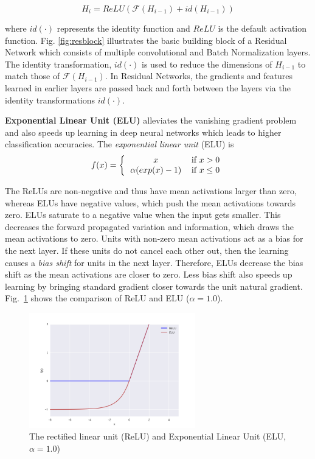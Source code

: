 \documentclass[10pt,twocolumn,letterpaper]{article}
\begin{document}
\begin{equation} \label{eq:1}
 H_i = ReLU( \mathcal{F}(H_{i-1}) + id(H_{i-1} ))
\end{equation}

where \( id(\cdot) \) represents the identity function and \( ReLU \) \cite{[8]} is the default activation function. Fig. \ref{fig:resblock} illustrates the basic building block of a Residual Network which consists of multiple convolutional and Batch Normalization layers. The identity transformation, \( id(\cdot) \) is used to reduce the dimensions of \( H_{i-1} \) to match those of \( \mathcal{F}(H_{i-1}) \). In Residual Networks, the gradients and features learned in earlier layers are passed back and forth between the layers via the identity transformations \( id(\cdot) \).

\textbf{Exponential Linear Unit (ELU)} \cite{[9]} alleviates the vanishing gradient problem and also speeds up learning in deep neural networks which leads to higher classification accuracies. The \emph{exponential linear unit} (ELU) is
\[ f(x) = \bigg \{ \begin{tabular}{cc}
$x$ & if $x > 0$ \\
$\alpha (exp(x)-1)$ & if $x \leq 0$
\end{tabular} \]


The ReLUs are non-negative and thus have mean activations larger than zero, whereas ELUs have negative values, which push the mean activations towards zero. ELUs saturate to a negative value when the input gets smaller. This decreases the forward propagated variation and information, which draws the mean activations to zero. Units with non-zero mean activations act as a bias for the next layer. If these units do not cancel each other out, then the learning causes a \emph{bias shift} for units in the next layer. Therefore, ELUs decrease the bias shift as the mean activations are closer to zero. Less bias shift also speeds up learning by bringing standard gradient closer towards the unit natural gradient. Fig.~\ref{fig:elu} shows the comparison of ReLU and ELU ($\alpha=1.0$).

\begin{figure}
\centering
\includegraphics[height=5cm]{activationgraph}
\caption{The rectified linear unit (ReLU) and Exponential Linear Unit (ELU, $\alpha = 1.0$)}
\label{fig:elu}
\end{figure}
\end{document}
